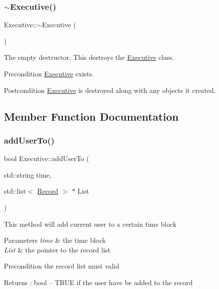 \subsubsection{\texorpdfstring{$\sim$\+Executive()}{~Executive()}}
{\footnotesize\ttfamily Executive\+::$\sim$\+Executive (\begin{DoxyParamCaption}{ }\end{DoxyParamCaption})}

The empty destructor. This destroys the \mbox{\hyperlink{class_executive}{Executive}} class. \begin{DoxyPrecond}{Precondition}
\mbox{\hyperlink{class_executive}{Executive}} exists. 
\end{DoxyPrecond}
\begin{DoxyPostcond}{Postcondition}
\mbox{\hyperlink{class_executive}{Executive}} is destroyed along with any objects it created. 
\end{DoxyPostcond}


\subsection{Member Function Documentation}
\mbox{\label{class_executive_a59e947ff980f9bd1ef0bb9ea8dae42b1}} 
\subsubsection{\texorpdfstring{add\+User\+To()}{addUserTo()}}
{\footnotesize\ttfamily bool Executive\+::add\+User\+To (\begin{DoxyParamCaption}\item[{std\+::string}]{time,  }\item[{std\+::list$<$ \mbox{\hyperlink{class_record}{Record}} $>$ $\ast$}]{List }\end{DoxyParamCaption})}

This method will add current user to a certain time block 
\begin{DoxyParams}{Parameters}
{\em time} & the time block \\
\hline
{\em List} & the pointer to the record list \\
\hline
\end{DoxyParams}
\begin{DoxyPrecond}{Precondition}
the record list must valid 
\end{DoxyPrecond}
\begin{DoxyReturn}{Returns}
\+: bool -- T\+R\+UE if the user have be added to the record 
\end{DoxyReturn}
\mbox{\label{class_executive_a513c12461670a2a2c6b5f69a387fa43c}} 
